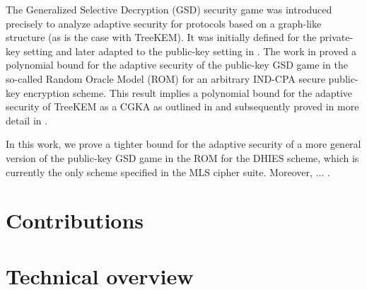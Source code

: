 The Generalized Selective Decryption (GSD) security game \cite{gsd} was introduced precisely to analyze adaptive security for protocols based on a graph-like structure (as is the case with TreeKEM). It was initially defined for the private-key setting and later adapted to the public-key setting in \cite{ttkem}. The work in \cite{ttkem} proved a polynomial bound for the adaptive security of the public-key GSD game in the so-called Random Oracle Model (ROM) for an arbitrary IND-CPA secure public-key encryption scheme. This result implies a polynomial bound for the adaptive security of TreeKEM as a CGKA as outlined in \cite[Theorem 4]{ttkem} and subsequently proved in more detail in \cite[Theorem 12]{modular-group-messaging}.

In this work, we prove a tighter bound for the adaptive security of a more general version of the public-key GSD game in the ROM for the DHIES scheme, which is currently the only scheme specified in the MLS cipher suite. Moreover, ... .


\section{Contributions}



\section{Technical overview}

